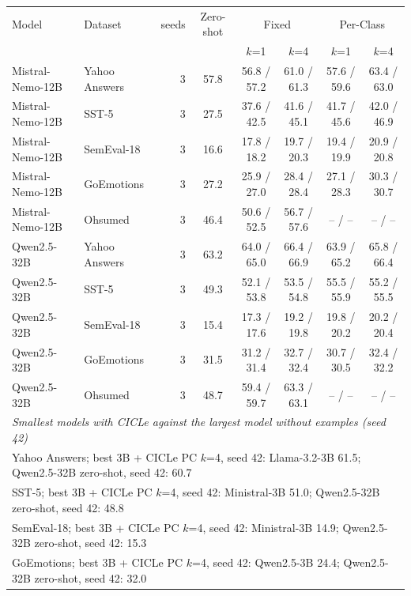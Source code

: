\begin{tabular}{llrccccc}
\toprule
Model & Dataset & seeds & Zero-shot & \multicolumn{2}{c}{Fixed} & \multicolumn{2}{c}{Per-Class} \\
 & & & & $k$=1 & $k$=4 & $k$=1 & $k$=4 \\
\midrule
Mistral-Nemo-12B & Yahoo Answers & 3 & 57.8 & 56.8 / 57.2 & 61.0 / 61.3 & 57.6 / 59.6 & 63.4 / 63.0 \\
Mistral-Nemo-12B & SST-5 & 3 & 27.5 & 37.6 / 42.5 & 41.6 / 45.1 & 41.7 / 45.6 & 42.0 / 46.9 \\
Mistral-Nemo-12B & SemEval-18 & 3 & 16.6 & 17.8 / 18.2 & 19.7 / 20.3 & 19.4 / 19.9 & 20.9 / 20.8 \\
Mistral-Nemo-12B & GoEmotions & 3 & 27.2 & 25.9 / 27.0 & 28.4 / 28.4 & 27.1 / 28.3 & 30.3 / 30.7 \\
Mistral-Nemo-12B & Ohsumed & 3 & 46.4 & 50.6 / 52.5 & 56.7 / 57.6 & -- / -- & -- / -- \\
\midrule
Qwen2.5-32B & Yahoo Answers & 3 & 63.2 & 64.0 / 65.0 & 66.4 / 66.9 & 63.9 / 65.2 & 65.8 / 66.4 \\
Qwen2.5-32B & SST-5 & 3 & 49.3 & 52.1 / 53.8 & 53.5 / 54.8 & 55.5 / 55.9 & 55.2 / 55.5 \\
Qwen2.5-32B & SemEval-18 & 3 & 15.4 & 17.3 / 17.6 & 19.2 / 19.8 & 19.8 / 20.2 & 20.2 / 20.4 \\
Qwen2.5-32B & GoEmotions & 3 & 31.5 & 31.2 / 31.4 & 32.7 / 32.4 & 30.7 / 30.5 & 32.4 / 32.2 \\
Qwen2.5-32B & Ohsumed & 3 & 48.7 & 59.4 / 59.7 & 63.3 / 63.1 & -- / -- & -- / -- \\
\midrule
\multicolumn{8}{l}{\emph{Smallest models with CICLe against the largest model without examples (seed 42)}} \\
\multicolumn{8}{l}{Yahoo Answers; best 3B + CICLe PC $k$=4, seed 42: Llama-3.2-3B 61.5; Qwen2.5-32B zero-shot, seed 42: 60.7} \\
\multicolumn{8}{l}{SST-5; best 3B + CICLe PC $k$=4, seed 42: Ministral-3B 51.0; Qwen2.5-32B zero-shot, seed 42: 48.8} \\
\multicolumn{8}{l}{SemEval-18; best 3B + CICLe PC $k$=4, seed 42: Ministral-3B 14.9; Qwen2.5-32B zero-shot, seed 42: 15.3} \\
\multicolumn{8}{l}{GoEmotions; best 3B + CICLe PC $k$=4, seed 42: Qwen2.5-3B 24.4; Qwen2.5-32B zero-shot, seed 42: 32.0} \\
\bottomrule
\end{tabular}
